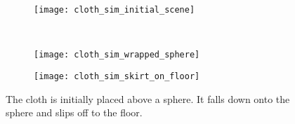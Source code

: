 \begin{figure}[h]
	\centering
	\begin{subfigure}{0.48\textwidth}
		\texttt{[image: cloth\_sim\_initial\_scene]}
		\label{fig:scene_init}
	\end{subfigure}
	\\
	\begin{subfigure}{0.48\textwidth}
		\texttt{[image: cloth\_sim\_wrapped\_sphere]}
		\label{fig:scene_wrap}
	\end{subfigure}
	\quad
	\begin{subfigure}{0.48\textwidth}
		\texttt{[image: cloth\_sim\_skirt\_on\_floor]}
		\label{fig:scene_floor}
	\end{subfigure}
	\caption{The cloth is initially placed above a sphere. It falls down onto the sphere and slips off to the floor.}
	\label{fig:scene}
\end{figure}
